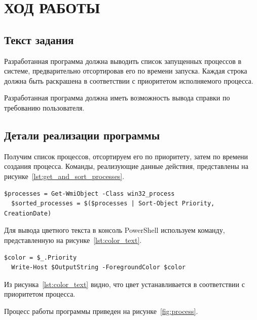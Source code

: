 \section{ХОД РАБОТЫ}

\subsection{Текст задания}

Разработанная программа должна выводить список запущенных процессов в системе,
предварительно отсортировав его по времени запуска. Каждая строка
должна быть раскрашена в соответствии с приоритетом исполняемого процесса.

Разработанная программа должна иметь возможность вывода справки по требованию пользователя.

\subsection{Детали реализации программы}

Получим список процессов, отсортируем его по приоритету, затем по времени создания процесса.
Команды, реализующие данные действия, представлены на рисунке~\ref{lst:get_and_sort_processes}.

\begin{lstlisting}[caption=Получение и сортировка списка запущенных процессов, label=lst:get_and_sort_processes]
  $processes = Get-WmiObject -Class win32_process
  $sorted_processes = $($processes | Sort-Object Priority, CreationDate)
\end{lstlisting}

Для вывода цветного текста в консоль PowerShell используем команду, представленную на рисунке~\ref{lst:color_text}.
\begin{lstlisting}[caption=Вывод цветного текста в консоль PowerShell, label=lst:color_text]
  $color = $_.Priority
  Write-Host $OutputString -ForegroundColor $color
\end{lstlisting}

Из рисунка~\ref{lst:color_text} видно, что цвет устанавливается в соответствии с приоритетом процесса.

\newpage
Процесс работы программы приведен на рисунке~\ref{fig:process}.

